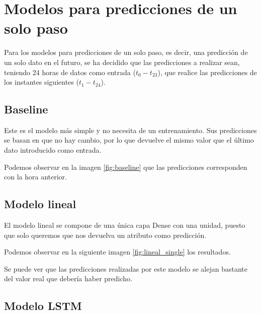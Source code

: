 \section{Modelos para predicciones de un solo paso}

Para los modelos para predicciones de un solo paso, es decir, una predicción de un solo dato en el futuro, se ha decidido que las predicciones a realizar sean, teniendo 24 horas de datos como entrada ($t_0-t_{23}$), que realice las predicciones de los instantes siguientes ($t_1-t_{24}$).


\subsection{Baseline}

Este es el modelo más simple y no necesita de un entrenamiento. Sus predicciones se basan en que no hay cambio, por lo que devuelve el mismo valor que el último dato introducido como entrada.

\par

Podemos observar en la imagen \ref{fig:baseline} que las predicciones corresponden con la hora anterior.


\subsection{Modelo lineal}

El modelo lineal se compone de una única capa Dense con una unidad, puesto que solo queremos que nos devuelva un atributo como predicción.


Podemos observar en la siguiente imagen \ref{fig:lineal_single} los resultados.


Se puede ver que las predicciones realizadas por este modelo se alejan bastante del valor real que debería haber predicho.

\subsection{Modelo LSTM}

